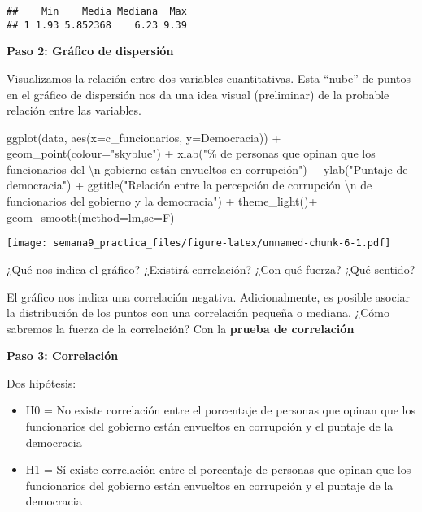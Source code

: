 \documentclass[
]{article}
\newenvironment{Shaded}{\begin{snugshade}}{\end{snugshade}}
\newcommand{\AttributeTok}[1]{\textcolor[rgb]{0.77,0.63,0.00}{#1}}
\newcommand{\FunctionTok}[1]{\textcolor[rgb]{0.00,0.00,0.00}{#1}}
\newcommand{\NormalTok}[1]{#1}
\newcommand{\SpecialCharTok}[1]{\textcolor[rgb]{0.00,0.00,0.00}{#1}}
\newcommand{\StringTok}[1]{\textcolor[rgb]{0.31,0.60,0.02}{#1}}
\providecommand{\tightlist}{%
  \setlength{\itemsep}{0pt}\setlength{\parskip}{0pt}}
\begin{document}
\begin{verbatim}
##    Min    Media Mediana  Max
## 1 1.93 5.852368    6.23 9.39
\end{verbatim}

\textbf{Paso 2: Gráfico de dispersión}

Visualizamos la relación entre dos variables cuantitativas. Esta
``nube'' de puntos en el gráfico de dispersión nos da una idea visual
(preliminar) de la probable relación entre las variables.

\begin{Shaded}
\begin{Highlighting}[]
\FunctionTok{ggplot}\NormalTok{(data, }\FunctionTok{aes}\NormalTok{(}\AttributeTok{x=}\NormalTok{c\_funcionarios, }\AttributeTok{y=}\NormalTok{Democracia)) }\SpecialCharTok{+}
  \FunctionTok{geom\_point}\NormalTok{(}\AttributeTok{colour=}\StringTok{"skyblue"}\NormalTok{) }\SpecialCharTok{+}  \FunctionTok{xlab}\NormalTok{(}\StringTok{"\% de personas que opinan que los funcionarios del }\SpecialCharTok{\textbackslash{}n}\StringTok{ gobierno están envueltos en corrupción"}\NormalTok{) }\SpecialCharTok{+}  \FunctionTok{ylab}\NormalTok{(}\StringTok{"Puntaje de democracia"}\NormalTok{) }\SpecialCharTok{+}
  \FunctionTok{ggtitle}\NormalTok{(}\StringTok{"Relación entre la percepción de corrupción }\SpecialCharTok{\textbackslash{}n}\StringTok{ de funcionarios del gobierno y la democracia"}\NormalTok{) }\SpecialCharTok{+}
  \FunctionTok{theme\_light}\NormalTok{()}\SpecialCharTok{+} \FunctionTok{geom\_smooth}\NormalTok{(}\AttributeTok{method=}\NormalTok{lm,}\AttributeTok{se=}\NormalTok{F)}
\end{Highlighting}
\end{Shaded}

\texttt{[image: semana9\_practica\_files/figure-latex/unnamed-chunk-6-1.pdf]}

¿Qué nos indica el gráfico? ¿Existirá correlación? ¿Con qué fuerza? ¿Qué
sentido?

El gráfico nos indica una correlación negativa. Adicionalmente, es
posible asociar la distribución de los puntos con una correlación
pequeña o mediana. ¿Cómo sabremos la fuerza de la correlación? Con la
\textbf{prueba de correlación}

\textbf{Paso 3: Correlación}

Dos hipótesis:

\begin{itemize}
\tightlist
\item
  H0 = No existe correlación entre el porcentaje de personas que opinan
  que los funcionarios del gobierno están envueltos en corrupción y el
  puntaje de la democracia
\item
  H1 = Sí existe correlación entre el porcentaje de personas que opinan
  que los funcionarios del gobierno están envueltos en corrupción y el
  puntaje de la democracia
\end{itemize}
\end{document}
